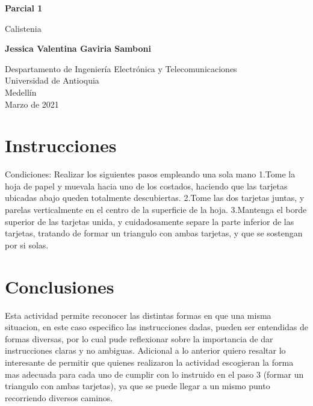 \documentclass{article}
\begin{document}
\begin{titlepage}
    \begin{center}
        \vspace*{1cm}
            
        \Huge
        \textbf{Parcial 1}
            
        \vspace{0.5cm}
        \LARGE
         Calistenia
            
        \vspace{1.5cm}
            
        \textbf{Jessica Valentina Gaviria Samboni}
            
        \vfill
            
        \vspace{0.8cm}
            
        \Large
        Despartamento de Ingeniería Electrónica y Telecomunicaciones\\
        Universidad de Antioquia\\
        Medellín\\
        Marzo de 2021
            
    \end{center}
\end{titlepage}

\tableofcontents
\newpage
\section{Instrucciones}\label{intro}
Condiciones:
Realizar los siguientes pasos empleando una sola mano
\newline
1.Tome la hoja de papel y muevala hacia uno de los costados, haciendo que las tarjetas ubicadas abajo queden totalmente descubiertas.
\newline
2.Tome las dos tarjetas juntas, y parelas verticalmente en el centro de la superficie de la hoja.
\newline
3.Mantenga el borde superior de las tarjetas unida, y cuidadosamente separe la parte inferior de las tarjetas, tratando de formar un triangulo con ambas tarjetas, y que se sostengan por si solas.
\section{Conclusiones}\label{intro}
Esta actividad permite reconocer las distintas formas en que una misma situacion, en este caso especifico las instrucciones dadas, pueden ser entendidas de formas diversas, por lo  cual pude reflexionar sobre la importancia de dar instrucciones claras y no ambiguas.
Adicional a lo anterior quiero resaltar lo interesante  de permitir que quienes realizaron la actividad escogieran la forma mas adecuada para cada uno de cumplir con lo instruido en el paso 3 (formar un triangulo con ambas tarjetas), ya que se puede llegar a un mismo punto recorriendo diversos caminos.





\cite{classroomInformaticaII}
\end{document}
